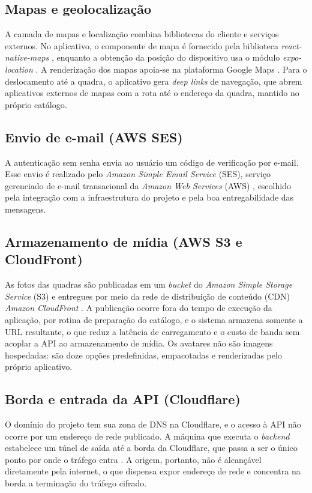         \subsection{Mapas e geolocalização}
        A camada de mapas e localização combina bibliotecas do cliente e serviços externos. No aplicativo, o componente de mapa é fornecido pela biblioteca \textit{react-native-maps} \cite{rn_maps_docs}, enquanto a obtenção da posição do dispositivo usa o módulo \textit{expo-location} \cite{expo_location_docs}. A renderização dos mapas apoia-se na plataforma Google Maps \cite{google_maps_docs}. Para o deslocamento até a quadra, o aplicativo gera \textit{deep links} de navegação, que abrem aplicativos externos de mapas com a rota até o endereço da quadra, mantido no próprio catálogo.

        \subsection{Envio de e-mail (AWS SES)}
        A autenticação sem senha envia ao usuário um código de verificação por e-mail. Esse envio é realizado pelo \textit{Amazon Simple Email Service} (SES), serviço gerenciado de e-mail transacional da \textit{Amazon Web Services} (AWS) \cite{aws_ses_docs}, escolhido pela integração com a infraestrutura do projeto e pela boa entregabilidade das mensagens.

        \subsection{Armazenamento de mídia (AWS S3 e CloudFront)}
        As fotos das quadras são publicadas em um \textit{bucket} do \textit{Amazon Simple Storage Service} (S3) \cite{aws_s3_docs} e entregues por meio da rede de distribuição de conteúdo (CDN) \textit{Amazon CloudFront} \cite{aws_cloudfront_docs}. A publicação ocorre fora do tempo de execução da aplicação, por rotina de preparação do catálogo, e o sistema armazena somente a URL resultante, o que reduz a latência de carregamento e o custo de banda sem acoplar a API ao armazenamento de mídia. Os avatares não são imagens hospedadas: são doze opções predefinidas, empacotadas e renderizadas pelo próprio aplicativo.

        \subsection{Borda e entrada da API (Cloudflare)}
        O domínio do projeto tem sua zona de DNS na Cloudflare, e o acesso à API não ocorre por um endereço de rede publicado. A máquina que executa o \textit{backend} estabelece um túnel de saída até a borda da Cloudflare, que passa a ser o único ponto por onde o tráfego entra \cite{cloudflare_tunnel_docs}. A origem, portanto, não é alcançável diretamente pela internet, o que dispensa expor endereço de rede e concentra na borda a terminação do tráfego cifrado.

